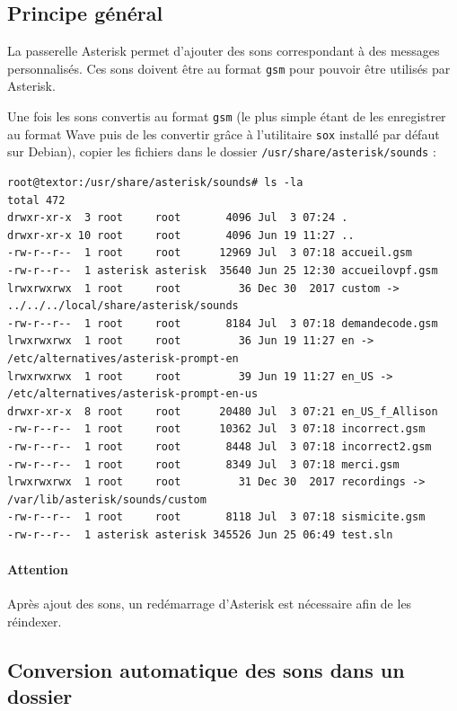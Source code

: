 \documentclass{article}
\begin{document}
\subsection{Principe général}

La passerelle Asterisk permet d'ajouter des sons correspondant à des messages personnalisés. Ces sons doivent être au format \texttt{gsm} pour pouvoir être utilisés par Asterisk.

Une fois les sons convertis au format \texttt{gsm} (le plus simple étant de les enregistrer au format Wave puis de les convertir grâce à l'utilitaire \texttt{sox} installé par défaut sur Debian), copier les fichiers dans le dossier \texttt{/usr/share/asterisk/sounds} :

\begin{verbatim}
root@textor:/usr/share/asterisk/sounds# ls -la
total 472
drwxr-xr-x  3 root     root       4096 Jul  3 07:24 .
drwxr-xr-x 10 root     root       4096 Jun 19 11:27 ..
-rw-r--r--  1 root     root      12969 Jul  3 07:18 accueil.gsm
-rw-r--r--  1 asterisk asterisk  35640 Jun 25 12:30 accueilovpf.gsm
lrwxrwxrwx  1 root     root         36 Dec 30  2017 custom -> ../../../local/share/asterisk/sounds
-rw-r--r--  1 root     root       8184 Jul  3 07:18 demandecode.gsm
lrwxrwxrwx  1 root     root         36 Jun 19 11:27 en -> /etc/alternatives/asterisk-prompt-en
lrwxrwxrwx  1 root     root         39 Jun 19 11:27 en_US -> /etc/alternatives/asterisk-prompt-en-us
drwxr-xr-x  8 root     root      20480 Jul  3 07:21 en_US_f_Allison
-rw-r--r--  1 root     root      10362 Jul  3 07:18 incorrect.gsm
-rw-r--r--  1 root     root       8448 Jul  3 07:18 incorrect2.gsm
-rw-r--r--  1 root     root       8349 Jul  3 07:18 merci.gsm
lrwxrwxrwx  1 root     root         31 Dec 30  2017 recordings -> /var/lib/asterisk/sounds/custom
-rw-r--r--  1 root     root       8118 Jul  3 07:18 sismicite.gsm
-rw-r--r--  1 asterisk asterisk 345526 Jun 25 06:49 test.sln
\end{verbatim}

\paragraph{Attention} Après ajout des sons, un redémarrage d'Asterisk est nécessaire afin de les réindexer.

\subsection{Conversion automatique des sons dans un dossier}
\end{document}
